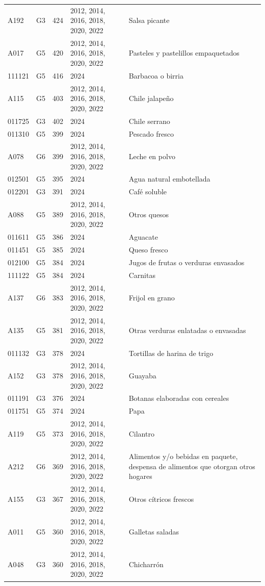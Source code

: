 \begin{table}[ht]
\begin{tabular}{llrll}
  A192 & G3 & 424 & 2012, 2014, 2016, 2018, 2020, 2022 & Salsa picante \\ 
  A017 & G5 & 420 & 2012, 2014, 2016, 2018, 2020, 2022 & Pasteles y pastelillos empaquetados \\ 
  111121 & G5 & 416 & 2024 & Barbacoa o birria \\ 
  A115 & G5 & 403 & 2012, 2014, 2016, 2018, 2020, 2022 & Chile jalapeño \\ 
  011725 & G3 & 402 & 2024 & Chile serrano \\ 
  011310 & G5 & 399 & 2024 & Pescado fresco \\ 
  A078 & G6 & 399 & 2012, 2014, 2016, 2018, 2020, 2022 & Leche en polvo \\ 
  012501 & G5 & 395 & 2024 & Agua natural embotellada \\ 
  012201 & G3 & 391 & 2024 & Café soluble \\ 
  A088 & G5 & 389 & 2012, 2014, 2016, 2018, 2020, 2022 & Otros quesos \\ 
  011611 & G5 & 386 & 2024 & Aguacate \\ 
  011451 & G5 & 385 & 2024 & Queso fresco \\ 
  012100 & G5 & 384 & 2024 & Jugos de frutas o verduras envasados \\ 
  111122 & G5 & 384 & 2024 & Carnitas \\ 
  A137 & G6 & 383 & 2012, 2014, 2016, 2018, 2020, 2022 & Frijol en grano \\ 
  A135 & G5 & 381 & 2012, 2014, 2016, 2018, 2020, 2022 & Otras verduras enlatadas o envasadas \\ 
  011132 & G3 & 378 & 2024 & Tortillas de harina de trigo \\ 
  A152 & G3 & 378 & 2012, 2014, 2016, 2018, 2020, 2022 & Guayaba \\ 
  011191 & G3 & 376 & 2024 & Botanas elaboradas con cereales \\ 
  011751 & G5 & 374 & 2024 & Papa \\ 
  A119 & G5 & 373 & 2012, 2014, 2016, 2018, 2020, 2022 & Cilantro \\ 
  A212 & G6 & 369 & 2012, 2014, 2016, 2018, 2020, 2022 & Alimentos y/o bebidas en paquete, despensa de alimentos que otorgan otros hogares \\ 
  A155 & G3 & 367 & 2012, 2014, 2016, 2018, 2020, 2022 & Otros cítricos frescos \\ 
  A011 & G5 & 360 & 2012, 2014, 2016, 2018, 2020, 2022 & Galletas saladas \\ 
  A048 & G3 & 360 & 2012, 2014, 2016, 2018, 2020, 2022 & Chicharrón \\ 

\end{tabular}
\end{table}
